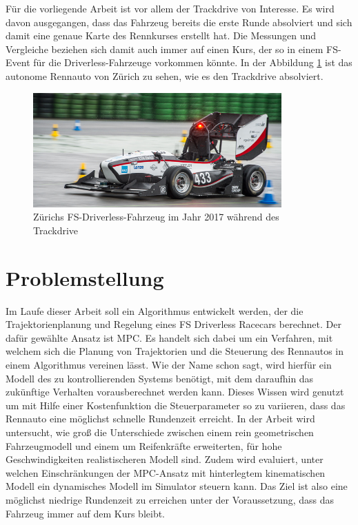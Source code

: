 \documentclass{like}
\begin{document}
Für die vorliegende Arbeit ist vor allem der Trackdrive von Interesse. Es wird davon ausgegangen, dass das Fahrzeug bereits die erste Runde absolviert und sich damit eine genaue Karte des Rennkurses erstellt hat. Die Messungen und Vergleiche beziehen sich damit auch immer auf einen Kurs, der so in einem \ac{FS}-Event für die Driverless-Fahrzeuge vorkommen könnte. 
In der Abbildung \ref{fig:zurichDriverless} ist das autonome Rennauto von Zürich zu sehen, wie es den Trackdrive absolviert.
\begin{figure}[hb!]
	\centering
	\includegraphics[width=270pt]{Abbildungen/amz-driverless-long.jpg}
	\caption{Zürichs \ac{FS}-Driverless-Fahrzeug im Jahr 2017 während des Trackdrive \cite{AMZRacing}}
	\label{fig:zurichDriverless}
\end{figure}

\section{Problemstellung}
Im Laufe dieser Arbeit soll ein Algorithmus entwickelt werden, der die Trajektorienplanung und Regelung eines \ac{FS} Driverless Racecars berechnet. Der dafür gewählte Ansatz ist \ac{MPC}. Es handelt sich dabei um ein Verfahren, mit welchem sich die Planung von Trajektorien und die Steuerung des Rennautos in einem Algorithmus vereinen lässt. Wie der Name schon sagt, wird hierfür ein Modell des zu kontrollierenden Systems benötigt, mit dem daraufhin das zukünftige Verhalten vorausberechnet werden kann. Dieses Wissen wird genutzt um mit Hilfe einer Kostenfunktion die Steuerparameter so zu variieren, dass das Rennauto eine möglichst schnelle Rundenzeit erreicht. In der Arbeit wird untersucht, wie groß die Unterschiede zwischen einem rein geometrischen Fahrzeugmodell und einem um Reifenkräfte erweiterten, für hohe Geschwindigkeiten realistischeren Modell sind. Zudem wird evaluiert, unter welchen Einschränkungen der \ac{MPC}-Ansatz mit hinterlegtem ki\-ne\-ma\-tischen Modell ein dynamisches Modell im Simulator steuern kann. Das Ziel ist also eine möglichst niedrige Rundenzeit zu erreichen unter der Voraussetzung, dass das Fahrzeug immer auf dem Kurs bleibt.
\end{document}
